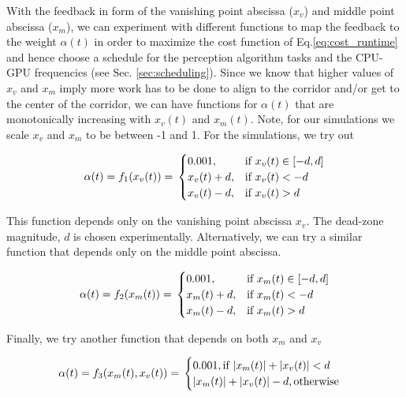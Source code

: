 With the feedback in form of the vanishing point abscissa ($x_v$) and middle point abscissa ($x_m$), we can experiment with different functions to map the feedback to the weight $\alpha(t)$ in order to maximize the cost function of Eq.\ref{eq:cost_runtime} and hence choose a schedule for the perception algorithm tasks and the CPU-GPU frequencies (see Sec. \ref{sec:scheduling}). 
Since we know that higher values of $x_v$ and $x_m$ imply more work has to be done to align to the corridor and/or get to the center of the corridor, we can have functions for $\alpha(t)$ that are monotonically increasing with $x_v(t)$ and $x_m(t)$. Note, for our simulations we scale $x_v$ and $x_m$ to be between -1 and 1. For the simulations, we try out

{\footnotesize{
\begin{equation}
\alpha(t) = f_1(x_v(t)) = \\
\begin{cases}
0.001,&\text{if }x_v(t)\in[-d,d]\\
x_v(t)+d,&\text{if }x_v(t)<-d\\
x_v(t)-d,&\text{if }x_v(t)>d
\end{cases}
\label{eq:f1}
\end{equation}
}}


This function depends only on the vanishing point abscissa $x_v$. The dead-zone magnitude, $d$ is chosen experimentally. Alternatively, we can try a similar function that depends only on the middle point abscissa.

\footnotesize{
\begin{equation}
\alpha(t) = f_2(x_m(t)) = \\
\begin{cases}
0.001,&\text{if }x_m(t)\in[-d,d]\\
x_m(t)+d,&\text{if }x_m(t)<-d\\
x_m(t)-d,&\text{if }x_m(t)>d
\end{cases}
\label{eq:f2}
\end{equation}
}

Finally, we try another function that depends on both $x_m$ and $x_v$

\footnotesize{
\begin{equation}
\alpha(t) = f_3(x_m(t),x_v(t)) = \\
\begin{cases}
0.001,\text{if }|x_m(t)|+|x_v(t)|<d\\
|x_m(t)|+|x_v(t)|-d,\text{otherwise}\\
\end{cases}
\label{eq:f2}
\end{equation}
}








